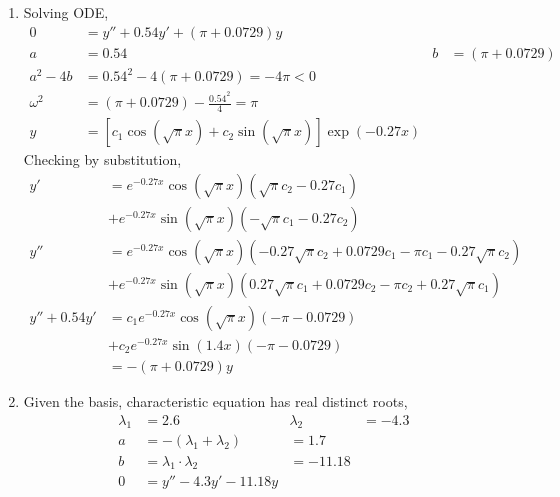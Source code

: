 \begin{enumerate}
    \item Solving ODE,
          \begin{align}
              0          & = y'' + 0.54y' + (\pi + 0.0729)y                                                          \\
              a          & = 0.54                                                             & b & = (\pi + 0.0729) \\
              a^{2} - 4b & = 0.54^{2} - 4(\pi + 0.0729) = -4\pi < 0                                                  \\
              \omega^{2} & = (\pi + 0.0729) - \frac{0.54^{2}}{4} = \pi                                               \\
              y          & = [c_{1}\cos(\sqrt{\pi} x) + c_{2}\sin(\sqrt{\pi} x)] \exp(-0.27x)
          \end{align}
          Checking by substitution,
          \begin{align}
              y'           & = e^{-0.27x}\cos(\sqrt{\pi} x) (\sqrt{\pi} c_{2} - 0.27c_{1})                                          \\
                           & + e^{-0.27x}\sin(\sqrt{\pi} x)(-\sqrt{\pi} c_{1} - 0.27c_{2})                                          \\
              y''          & = e^{-0.27x}\cos(\sqrt{\pi} x)(-0.27\sqrt{\pi} c_{2} + 0.0729c_{1} - \pi c_{1} - 0.27\sqrt{\pi} c_{2}) \\
                           & + e^{-0.27x}\sin(\sqrt{\pi} x)(0.27\sqrt{\pi} c_{1} + 0.0729c_{2} - \pi c_{2} + 0.27\sqrt{\pi} c_{1})  \\
              y'' + 0.54y' & = c_{1}e^{-0.27x}\cos(\sqrt{\pi} x)(-\pi-0.0729)                                                       \\
                           & + c_{2}e^{-0.27x}\sin(1.4x)(-\pi-0.0729)                                                               \\
                           & = -(\pi + 0.0729) y
          \end{align}

    \item Given the basis, characteristic equation has real distinct roots,
          \begin{align}
              \lambda_{1} & = 2.6                           & \lambda_{2} & = -4.3 \\
              a           & = -(\lambda_{1} + \lambda_{2})  & = 1.7                \\
              b           & = \lambda_{1} \cdot \lambda_{2} & = -11.18             \\
              0           & = y'' -4.3y' - 11.18y
          \end{align}


\end{enumerate}
